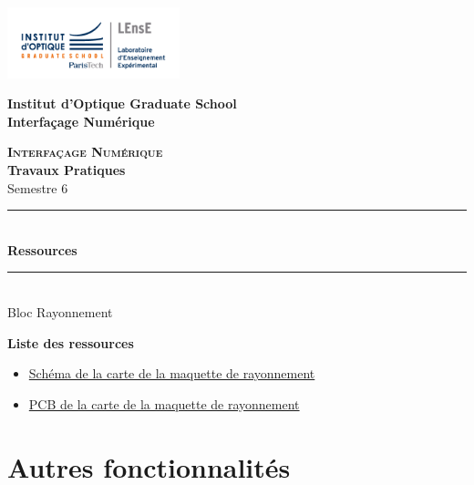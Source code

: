 \documentclass[a4paper,11pt,titlepage]{article} %
\begin{document}
\newpage
\begin{center}
	\begin{minipage}{2.5cm}
	\begin{center}
		\includegraphics[width=5cm]{images/Logo-LEnsE.png}
	\end{center}
\end{minipage}\hfill
\begin{minipage}{10cm}
	\begin{center}
	\textbf{Institut d'Optique Graduate School }\\[0.1cm]
    \textbf{Interfaçage Numérique}


	\end{center}
\end{minipage}\hfill


\vspace{2cm}


{\Large \bfseries \textsc{Interfaçage Numérique}} \\[0.5cm]
{\large \bfseries Travaux Pratiques} \\[0.2cm]
Semestre 6

\vspace{1cm}

\rule{\linewidth}{0.4mm} \\[0.4cm]
{ \Large \bfseries\color{violet_iogs} Ressources \\[0.4cm] }
\rule{\linewidth}{0.4mm} \\[1cm]
{\large Bloc Rayonnement}

\end{center}

\vspace{3cm}

\textbf{\large Liste des ressources}
\begin{itemize}
	\item \hyperref[doc:robot_schematic]{Schéma de la carte de la maquette de rayonnement}
	\item \hyperref[doc:robot_pcb]{PCB de la carte de la maquette de rayonnement}
\end{itemize}

\vfill

\section{Autres fonctionnalités}
\end{document}
